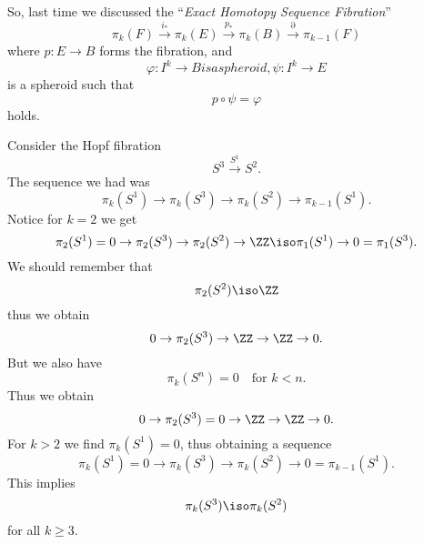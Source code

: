 
So, last time we discussed the ``\emph{Exact Homotopy Sequence Fibration\/}''
\begin{equation}
\pi_{k}(F)\xrightarrow{i_{*}}
\pi_{k}(E)\xrightarrow{p_{*}}
\pi_{k}(B)\xrightarrow{\partial}
\pi_{k-1}(F)
\end{equation}
where $p\colon E\to B$ forms the fibration, and
\begin{subequations}
\begin{equation}
\varphi\colon I^k\to B 
\end{equation}
is a spheroid, 
\begin{equation}
\psi\colon I^k\to E 
\end{equation}
\end{subequations}
is a spheroid such that 
\begin{equation}
p\circ\psi=\varphi
\end{equation}
holds.

Consider the Hopf fibration
\begin{equation}
S^{3}\xrightarrow{S^1}S^2.
\end{equation}
The sequence we had was
\begin{equation}
\pi_{k}(S^{1})\to\pi_{k}(S^{3})\to\pi_{k}(S^2)\to\pi_{k-1}(S^1).
\end{equation}
Notice for $k=2$ we get
\begin{equation}
\pi_{2}(S^{1})=0\to\pi_{2}(S^{3})\to\pi_{2}(S^2)\to\ZZ\iso\pi_{1}(S^1)\to0=\pi_{1}(S^{3}).
\end{equation}
We should remember that
\begin{equation}
\pi_{2}(S^2)\iso\ZZ
\end{equation}
thus we obtain
\begin{equation}
0\to\pi_{2}(S^{3})\to\ZZ\to\ZZ\to0.
\end{equation}
But we also have
\begin{equation}
\pi_{k}(S^{n})=0\quad\mbox{for }k<n.
\end{equation}
Thus we obtain
\begin{equation}
0\to\pi_{2}(S^{3})=0\to\ZZ\to\ZZ\to0.
\end{equation}
For $k>2$ we find $\pi_{k}(S^1)=0$, thus obtaining a sequence
\begin{equation}
\pi_{k}(S^{1})=0\to\pi_{k}(S^{3})\to\pi_{k}(S^{2})\to0=\pi_{k-1}(S^1).
\end{equation}
This implies
\begin{equation}
\pi_{k}(S^{3})\iso\pi_{k}(S^{2})
\end{equation}
for all $k\geq3$.

